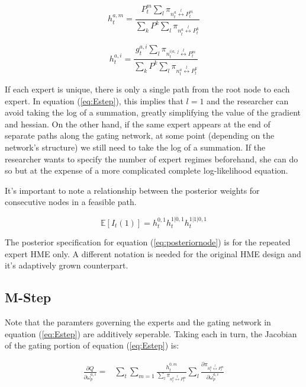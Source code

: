 \documentclass[12pt]{article}
\newcommand{\sumgateprod}[3]{\pi_{#1 \overset{#3}{\longleftrightarrow} #2}}
\newcommand{\shortsum}[1]{\sum \nolimits_{#1}}
\begin{document}
\begin{equation} \label{eq:posteriornode}
  h^{a,m}_{t} = \frac{P^{m}_{t} \shortsum{l} \sumgateprod{n^{a}_{t}}{P^{m}_{t}}{l}}{\sum_{k} P^{k} \shortsum{l} \sumgateprod{n^{a}_{t}}{P^{k}_{t}}{l}}
\end{equation}

\begin{equation} \label{eq:posteriornode2}
  h^{a, i}_{t} = \frac{ g^{a, i}_{t} \shortsum{l} \sumgateprod{n^{i|a, \, j}_{t}}{P^{m}_{t}}{l}}{\sum_{k} P^{k} \shortsum{l} \sumgateprod{n^{a}_{t}}{P^{k}_{t}}{l}}
\end{equation}

If each expert is unique, there is only a single path from the root node to each
expert. In equation (\ref{eq:Estep}), this implies that $l = 1$ and the researcher
can avoid taking the log of a summation, greatly simplifying the value of the
gradient and hessian. On the other hand, if the same expert appears at the end of
separate paths along the gating network, at some point (depending on the network's
structure) we still need to take the log of a summation. If the researcher wants
to specify the number of expert regimes beforehand, she can do so but at the
expense of a more complicated complete log-likelihood equation.

It's important to note a relationship between the posterior weights for consecutive
nodes in a feasible path.

\begin{equation} \label{eq:posteriorrelation}
  \mathbb{E}\left[I_{t}(1)\right] = h^{0,1}_{t} h^{1|0,1}_{t} h^{1|1|0,1}_{t}
\end{equation}

The posterior specification for equation (\ref{eq:posteriornode}) is for the
repeated expert HME only. A different notation is needed for the original HME
design and it's adaptively grown counterpart.


\subsection{M-Step}

Note that the paramters governing the experts and the gating network in
equation (\ref{eq:Estep}) are additively seperable. Taking each in turn, the
Jacobian of the gating portion of equation (\ref{eq:Estep}) is:

\begin{equation} \label{eq:gateJacobian}
  \begin{split}
    \frac{\partial Q}{\partial \omega^{a,i}_{p}} =& \sum_{t} \sum_{m=1}  \frac{h^{0,m}_{t}}{\sum_{l} \pi_{n^{0}_{t} \overset{l}{\longleftrightarrow} P^{m}_{t}}} \sum_{l} \frac{\partial \pi_{n^{0}_{t} \overset{l}{\longleftrightarrow} P^{m}_{t}}}{\partial \omega^{a,i}_{p}} \\
  \end{split}
\end{equation}
\end{document}
